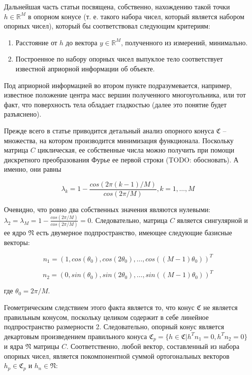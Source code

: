 \documentclass[a4paper,12pt, titlepage]{article}
\begin{document}
Дальнейшая часть статьи посвящена, собственно, нахождению такой точки 
$h \in \mathbb{R}^{M}$ в
опорном конусе (т. е. такого набора чисел, который является набором опорных
чисел), который бы соответствовал следующим критериям:

\begin{enumerate}
 \item Расстояние от $h$ до вектора $y \in \mathbb{R}^{M}$, полученного из
измерений, минимально.
 \item Построенное по набору опорных чисел выпуклое тело соответствует
известной априорной информации об объекте.
\end{enumerate}

Под априорной информацией во втором пункте подразумевается, например, известное
положение центра масс вершин полученного многоугольника, или тот факт, что
поверхность тела обладает гладкостью (далее это понятие будет разъяснено).

Прежде всего в статье приводится детальный анализ опорного конуса $\mathfrak{C}$
-- множества, на котором производится минимизация функционала. Поскольку матрица
$C$ циклическая, ее собственные числа можно получить при помощи дискретного
преобразования Фурье ее первой строки (TODO: обосновать). А именно, они равны

$$
\lambda_{k} = 1 - \frac{cos(2 \pi (k - 1) / M)}{cos(2 \pi / M)},
k = 1, \ldots, M
$$

Очевидно, что ровно два собственных значения являются нулевыми:
$\lambda_{2} = \lambda_{M} = 1 - \frac{cos(2 \pi / M)}{cos(2 \pi / M)} = 0$.
Следовательно, матрица $C$ является сингулярной и ее ядро $\mathfrak{N}$ есть
двумерное подпространство, имеющее следующие базисные векторы:

$$
n_{1} = (1, cos(\theta_{0}), cos(2 \theta_{0}), \ldots,
cos((M - 1) \theta_{0}))^{T}
$$

$$
n_{2} = (0, sin(\theta_{0}), sin(2 \theta_{0}), \ldots,
sin((M - 1) \theta_{0}))^{T}
$$

где $\theta_{0} = 2 \pi / M$.

Геометрическим следствием этого факта является то, что конус $\mathfrak{C}$ не
является правильным конусом, поскольку целиком содержит в себе линейное
подпространство размерности 2. Следовательно, опорный конус является декартовым
произведением правильного конуса
$\mathfrak{C}_{p} = \{h \in \mathfrak{C} | h^{T} n_{1} = 0, h^{T} n_{2} = 0\}$
и ядра $\mathfrak{N}$ матрицы $C$. Соответственно, любой вектор, составленный из
набора опорных чисел, является покомпонентной суммой ортогональных векторов
$h_{p} \in \mathfrak{C}_{p}$ и $h_{n} \in \mathfrak{N}$:
\end{document}
